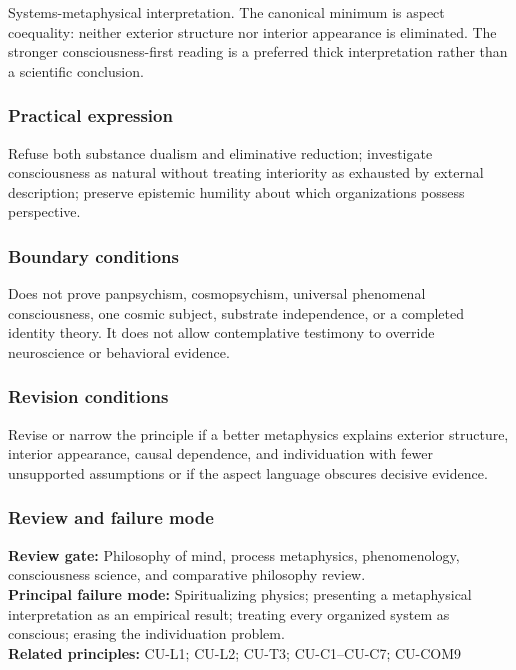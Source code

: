 \documentclass[
  11pt,
]{article}
\begin{document}
Systems-metaphysical interpretation. The canonical minimum is aspect
coequality: neither exterior structure nor interior appearance is
eliminated. The stronger consciousness-first reading is a preferred
thick interpretation rather than a scientific conclusion.

\subsubsection{Practical expression}\label{practical-expression}

Refuse both substance dualism and eliminative reduction; investigate
consciousness as natural without treating interiority as exhausted by
external description; preserve epistemic humility about which
organizations possess perspective.

\subsubsection{Boundary conditions}\label{boundary-conditions}

Does not prove panpsychism, cosmopsychism, universal phenomenal
consciousness, one cosmic subject, substrate independence, or a
completed identity theory. It does not allow contemplative testimony to
override neuroscience or behavioral evidence.

\subsubsection{Revision conditions}\label{revision-conditions}

Revise or narrow the principle if a better metaphysics explains exterior
structure, interior appearance, causal dependence, and individuation
with fewer unsupported assumptions or if the aspect language obscures
decisive evidence.

\subsubsection{Review and failure mode}\label{review-and-failure-mode}

\textbf{Review gate:} Philosophy of mind, process metaphysics,
phenomenology, consciousness science, and comparative philosophy
review.\\
\textbf{Principal failure mode:} Spiritualizing physics; presenting a
metaphysical interpretation as an empirical result; treating every
organized system as conscious; erasing the individuation problem.\\
\textbf{Related principles:} CU-L1; CU-L2; CU-T3; CU-C1--CU-C7; CU-COM9
\end{document}
